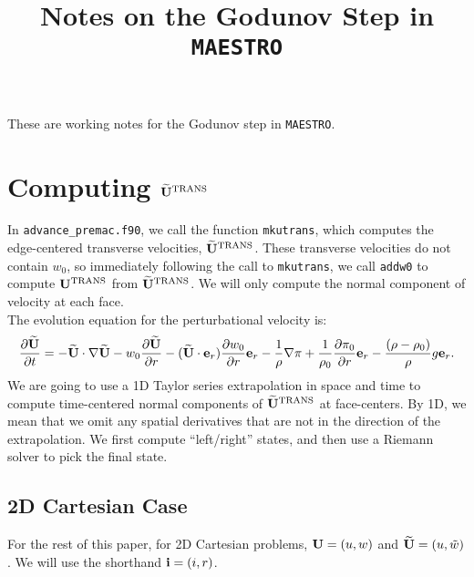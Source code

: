\documentclass[11pt]{article}
\title{Notes on the Godunov Step in {\tt MAESTRO}}
\def\trans {\rm TRANS}
\def\eb    {{\bf e}}
\def\ib    {{\bf i}}
\def\Ub    {{\bf U}}
\def\Ubt   {\widetilde{\bf U}}
\def\wt    {\tilde{w}}
\begin{document}
\maketitle

These are working notes for the Godunov step in {\tt MAESTRO}.

\section{Computing $\Ubt^{\trans}$}
In {\tt advance\_premac.f90}, we call the function {\tt mkutrans}, which computes the edge-centered transverse velocities, $\Ubt^{\trans}$.  These transverse velocities do not contain $w_0$, so immediately following the call to {\tt mkutrans}, we call {\tt addw0} to compute $\Ub^{\trans}$ from $\Ubt^{\trans}$.  We will only compute the normal component of velocity at each face.\\

The evolution equation for the perturbational velocity is:
\begin{equation}
\frac{\partial\Ubt}{\partial t} = -\Ubt\cdot\nabla\Ubt - w_0\frac{\partial\Ubt}{\partial r} - (\Ubt\cdot\eb_r)\frac{\partial w_0}{\partial r}\eb_r - \frac{1}{\rho}\nabla\pi + \frac{1}{\rho_0}\frac{\partial\pi_0}{\partial r}\eb_r - \frac{(\rho-\rho_0)}{\rho}g\eb_r.\label{Perturbational Velocity Equation}
\end{equation}
We are going to use a 1D Taylor series extrapolation in space and time to compute time-centered normal components of $\Ubt^{\trans}$ at face-centers.  By 1D, we mean that we omit any spatial derivatives that are not in the direction of the extrapolation.  We first compute ``left/right'' states, and then use a Riemann solver to pick the final state.\\
\subsection{2D Cartesian Case}
For the rest of this paper, for 2D Cartesian problems, $\Ub = (u,w)$ and $\Ubt = (u,\wt)$.  We will use the shorthand $\ib = (i,r)$.\\
\end{document}
